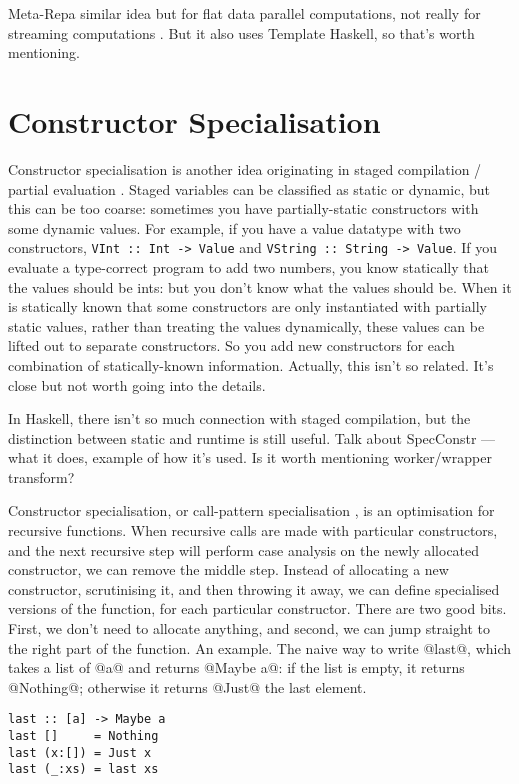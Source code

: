 Meta-Repa similar idea but for flat data parallel computations, not really for streaming computations \cite{ankner2013edsl}.
But it also uses Template Haskell, so that's worth mentioning.

\section{Constructor Specialisation}
Constructor specialisation is another idea originating in staged compilation / partial evaluation \cite{mogensen1993constructor}.
Staged variables can be classified as static or dynamic, but this can be too coarse: sometimes you have partially-static constructors with some dynamic values.
For example, if you have a value datatype with two constructors, \lstinline/VInt :: Int -> Value/ and \lstinline/VString :: String -> Value/.
If you evaluate a type-correct program to add two numbers, you know statically that the values should be ints: but you don't know what the values should be.
When it is statically known that some constructors are only instantiated with partially static values, rather than treating the values dynamically, these values can be lifted out to separate constructors.
So you add new constructors for each combination of statically-known information.
Actually, this isn't so related. It's close but not worth going into the details.

In Haskell, there isn't so much connection with staged compilation, but the distinction between static and runtime is still useful.
Talk about SpecConstr --- what it does, example of how it's used.
Is it worth mentioning worker/wrapper transform?

Constructor specialisation, or call-pattern specialisation \cite{peyton2007call}, is an optimisation for recursive functions.
When recursive calls are made with particular constructors, and the next recursive step will perform case analysis on the newly allocated constructor, we can remove the middle step.
Instead of allocating a new constructor, scrutinising it, and then throwing it away, we can define specialised versions of the function, for each particular constructor.
There are two good bits. First, we don't need to allocate anything, and second, we can jump straight to the right part of the function.
An example.
The naive way to write @last@, which takes a list of @a@ and returns @Maybe a@: if the list is empty, it returns @Nothing@; otherwise it returns @Just@ the last element.

\begin{lstlisting}
last :: [a] -> Maybe a
last []     = Nothing
last (x:[]) = Just x
last (_:xs) = last xs
\end{lstlisting}

